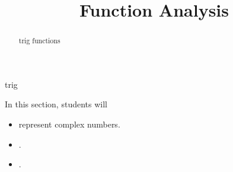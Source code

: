 \documentclass{ximera}
\title{Function Analysis}
\begin{document}
\begin{abstract}
trig functions
\end{abstract}
\maketitle








trig



\begin{sectionOutcomes}
In this section, students will 

\begin{itemize}
\item represent complex numbers.
\item .
\item .
\end{itemize}
\end{sectionOutcomes}
\end{document}
